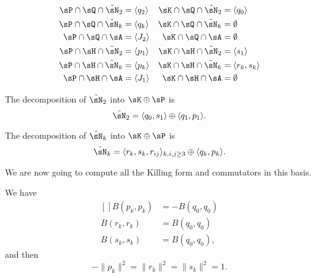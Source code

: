 \begin{subequations}
	\begin{align}
		\sP\cap\sQ\cap\tilde\sN_2 & =\langle q_2\rangle & \sK\cap\sQ\cap\tilde\sN_2 & =\langle q_0\rangle     \\
		\sP\cap\sQ\cap\tilde\sN_k & =\langle q_k\rangle & \sK\cap\sQ\cap\tilde\sN_k & =\emptyset              \\
		\sP\cap\sQ\cap\sA         & =\langle J_2\rangle & \sK\cap\sQ\cap\sA         & = \emptyset             \\
		\sP\cap\sH\cap\tilde\sN_2 & =\langle p_1\rangle & \sK\cap\sH\cap\tilde\sN_2 & =\langle s_1\rangle     \\
		\sP\cap\sH\cap\tilde\sN_k & =\langle p_k\rangle & \sK\cap\sH\cap\tilde\sN_k & =\langle r_k,s_k\rangle \\
		\sP\cap\sH\cap\sA         & =\langle J_1\rangle & \sK\cap\sH\cap\sA         & =\emptyset
	\end{align}
\end{subequations}

The decomposition of $\tilde\sN_2$ into $\sK\oplus\sP$ is
\begin{equation}		\label{LONGEqDecomptsNTroisKP}
	\tilde\sN_2=\langle q_0,s_1\rangle\oplus \langle q_1,p_1\rangle.
\end{equation}


The decomposition of $\tilde\sN_k$ into $\sK\oplus\sP$ is
\begin{equation}		\label{LONGEqDecomptsNkKP}
	\tilde\sN_k =\langle r_k,s_k,r_{ij}\rangle_{k,i,j\geq 3}\oplus \langle q_k,p_k\rangle.
\end{equation}


We are now going to compute all the Killing form and commutators in this basis.
\begin{proposition}		\label{LONGPropBprsk}
	We have
	\begin{equation}
		\begin{aligned}[]
			B(p_k,p_k) & =-B(q_0,q_0) \\
			B(r_k,r_k) & =B(q_0,q_0)  \\
			B(s_k,s_k) & =B(q_0,q_0),
		\end{aligned}
	\end{equation}
	and then
	\begin{equation}	\label{LONGeqNormInHigherDimensionalSlices}
		-\| p_k \|^2=\| r_k \|^2=\| s_k \|^2=1.
	\end{equation}
\end{proposition}

